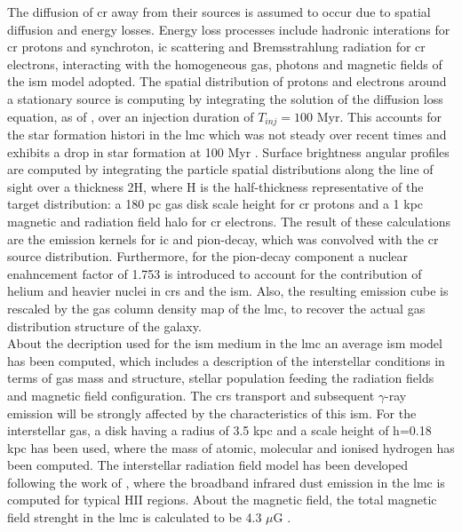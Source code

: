 \documentclass[main.tex]{subfiles}
\begin{document}
The diffusion of \gls{cr} away from their sources is assumed to occur due to spatial diffusion and energy losses. Energy loss processes include hadronic interations for \gls{cr} protons and synchroton, \gls{ic} scattering and Bremsstrahlung radiation for \gls{cr} electrons, interacting with the homogeneous gas, photons and magnetic fields of the \gls{ism} model adopted. The spatial distribution of protons and electrons around a stationary source is computing by integrating the solution of the diffusion loss equation, as of \cite{2006diffusionloss}, over an injection duration of $T_{inj} = 100$ Myr. This accounts for the star formation histori in the \gls{lmc} which was not steady over recent times and exhibits a drop in star formation at 100 Myr \cite{2009SFHofLMC}. Surface brightness angular profiles are computed by integrating the particle spatial distributions along the line of sight over a thickness 2H, where H is the half-thickness representative of the target distribution: a 180 pc gas disk scale height for \gls{cr} protons and a 1 kpc magnetic and radiation field halo for \gls{cr} electrons. The result of these calculations are the emission kernels for \gls{ic} and pion-decay, which was convolved with the \gls{cr} source distribution. Furthermore, for the pion-decay component a nuclear enahncement factor of 1.753 is introduced to account for the contribution of helium and heavier nuclei in \glspl{cr} and the \gls{ism}. Also, the resulting emission cube is rescaled by the gas column density map of the \gls{lmc}, to recover the actual gas distribution structure of the galaxy.\\
About the decription used for the \gls{ism} medium in the \gls{lmc}  an average \gls{ism} model has been computed, which includes a description of the interstellar conditions in terms of gas mass and structure, stellar population feeding the radiation fields and magnetic field configuration. The \glspl{cr} transport and subsequent $\gamma$-ray emission will be strongly affected by the characteristics of this \gls{ism}. For the interstellar gas, a disk having a radius of 3.5 kpc and a scale height of h=0.18 kpc has been used, where the mass of atomic, molecular and ionised hydrogen has been computed. The interstellar radiation field model has been developed following the work of \cite{2014DustEMLMCismemission}, where the broadband infrared dust emission in the \gls{lmc} is computed for typical HII regions. About the magnetic field, the total magnetic field strenght in the \gls{lmc} is calculated to be 4.3 $\mu$G \cite{2005LMCmagneticfield}.     
\end{document}
